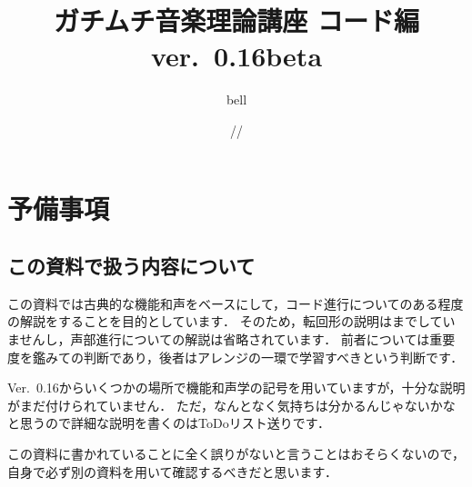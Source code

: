 \documentclass[dvipdfmx,uplatex,b5paper,openany,jbase=12Q,nomag*,textwidth-limit=44%
               ]{gachimuchi}[2020/05/05]
\title{ガチムチ音楽理論講座 コード編 ver.~0.16beta}
\author{bell}
\date{\the\year/\the\month/\the\day}
\begin{document}
\frontmatter
\maketitle
{}\tableofcontents
\clearpage%
\chapter{予備事項}%
\section{この資料で扱う内容について}%
この資料では古典的な機能和声をベースにして，コード進行についてのある程度の解説をすることを目的としています．
そのため，転回形の説明はまでしていませんし，声部進行についての解説は省略されています．
前者については重要度を鑑みての判断であり，後者はアレンジの一環で学習すべきという判断です．

Ver.~0.16からいくつかの場所で機能和声学の記号を用いていますが，十分な説明がまだ付けられていません．
ただ，なんとなく気持ちは分かるんじゃないかなと思うので詳細な説明を書くのはToDoリスト送りです．

この資料に書かれていることに全く誤りがないと言うことはおそらくないので，
自身で必ず別の資料を用いて確認するべきだと思います．

\end{document}
